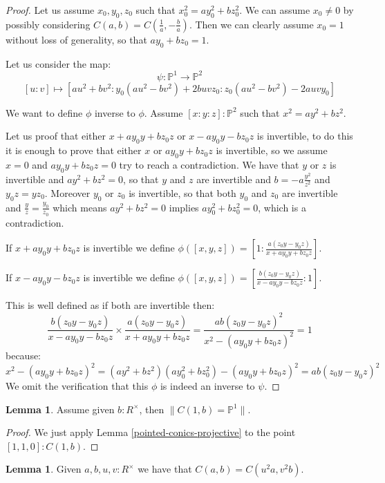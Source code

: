 \documentclass[10pt,a4paper]{article}
\theoremstyle{definition}
\newtheorem{lemma}[theorem]{Lemma}
\newcommand{\propTrunc}[1]{\lVert #1 \rVert}
\newcommand{\bP}{\mathbb{P}}
\begin{document}
\begin{proof}
Let us assume $x_0,y_0,z_0$ such that $x_0^2 = ay_0^2+bz_0^2$. We can assume $x_0\not=0$ by possibly considering $C(a,b) = C(\frac{1}{a},-\frac{b}{a})$. Then we can clearly assume $x_0=1$ without loss of generality, so that $ay_0 + bz_0 = 1$.

 Let us consider the map:
\[\psi:\bP^1\to \bP^2\]
\[[u:v] \mapsto [au^2+bv^2: y_0(au^2-bv^2) + 2buvz_0 : z_0(au^2-bv^2) - 2auvy_0]\]

We want to define $\phi$ inverse to $\phi$. Assume $[x:y:z]:\bP^2$ such that $x^2=ay^2+bz^2$. 

Let us proof that either $x+ay_0y+bz_0z$ or $x-ay_0y-bz_0z$ is invertible, to do this it is enough to prove that either $x$ or $ay_0y+bz_0z$ is invertible, so we assume $x=0$ and $ay_0y+bz_0z=0$ try to reach a contradiction. We have that $y$ or $z$ is invertible and $ay^2+bz^2=0$, so that $y$ and $z$ are invertible and $b = -a\frac{y^2}{z^2}$ and $y_0z=yz_0$. Moreover $y_0$ or $z_0$ is invertible, so that both $y_0$ and $z_0$ are invertible and $\frac{y}{z} = \frac{y_0}{z_0}$ which means $ay^2+bz^2=0$ implies $ay_0^2+bz_0^2=0$, which is a contradiction. 

If $x + ay_0y + bz_0z$ is invertible we define $\phi([x,y,z]) = [1:\frac{a(z_0y-y_0z)}{x + ay_0y + bz_0z}]$.

If $x - ay_0y - bz_0z$ is invertible we define $\phi([x,y,z]) = [\frac{b(z_0y-y_0z)}{x - ay_0y - bz_0z}:1]$.

This is well defined as if both are invertible then:
\[\frac{b(z_0y-y_0z)}{x - ay_0y - bz_0z}\times\frac{a(z_0y-y_0z)}{x + ay_0y + bz_0z} = \frac{ab(z_0y-y_0z)^2}{x^2 - (ay_0y + bz_0z)^2} = 1\]
because:
\[x^2 - (ay_0y + bz_0z)^2 = (ay^2+bz^2)(ay_0^2+bz_0^2) - (ay_0y + bz_0z)^2 = ab(z_0y-y_0z)^2\]
We omit the verification that this $\phi$ is indeed an inverse to $\psi$.
\end{proof}

\begin{lemma}\label{conic-one-split}
Assume given $b:R^\times$, then $\propTrunc{C(1,b) = \bP^1}$.
\end{lemma}

\begin{proof}
We just apply Lemma \ref{pointed-conics-projective} to the point $[1,1,0]:C(1,b)$.
\end{proof}

\begin{lemma}\label{conic-change-variable}
Given $a,b,u,v:R^\times$ we have that $C(a,b) = C(u^2a,v^2b)$.
\end{lemma}
\end{document}
